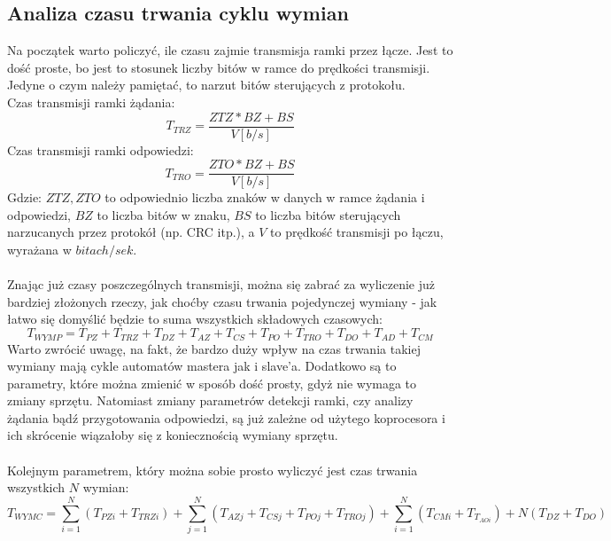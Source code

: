 	\subsection{Analiza czasu trwania cyklu wymian}
	Na początek warto policzyć, ile czasu zajmie transmisja ramki przez łącze. Jest to dość proste, bo jest to stosunek liczby bitów w ramce do prędkości transmisji. Jedyne o czym należy pamiętać, to narzut bitów sterujących z protokołu.\\
	Czas transmisji ramki żądania:
	\begin{equation}
		\label{eq:czasTrz}
		T_{TRZ} = \frac{ZTZ*BZ + BS}{V[b/s]}
	\end{equation}
	Czas transmisji ramki odpowiedzi:
	\begin{equation}
		\label{eq:czasTro}
		T_{TRO} = \frac{ZTO*BZ+BS}{V[b/s]}
	\end{equation}
	Gdzie: $ ZTZ, ZTO $ to odpowiednio liczba znaków w danych w ramce żądania i odpowiedzi, $ BZ $ to liczba bitów w znaku, $ BS $ to liczba bitów sterujących narzucanych przez protokół (np. CRC itp.), a $ V $ to prędkość transmisji po łączu, wyrażana w $ bitach/sek $.\\
	\\
	Znając już czasy poszczególnych transmisji, można się zabrać za wyliczenie już bardziej złożonych rzeczy, jak choćby czasu trwania pojedynczej wymiany - jak łatwo się domyślić będzie to suma wszystkich składowych czasowych:
	\begin{equation}
		\label{eq:czasPW}
		T_{WYMP} = T_{PZ}+T_{TRZ} + T_{DZ} + T_{AZ} + T_{CS} + T_{PO} + T_{TRO} + T_{DO} + T_{AD} + T_{CM}
	\end{equation}
	Warto zwrócić uwagę, na fakt, że bardzo duży wpływ na czas trwania takiej wymiany mają cykle automatów mastera jak i slave'a. Dodatkowo są to parametry, które można zmienić w sposób dość prosty, gdyż nie wymaga to zmiany sprzętu. Natomiast zmiany parametrów detekcji ramki, czy analizy żądania bądź przygotowania odpowiedzi, są już zależne od użytego koprocesora i ich skrócenie wiązałoby się z koniecznością wymiany sprzętu.\\
	\\
	Kolejnym parametrem, który można sobie prosto wyliczyć jest czas trwania wszystkich $ N $ wymian:
	\begin{equation}
		\label{eq:czasWW}
		T_{WYMC} = \sum\limits_{i=1}^N (T_{PZi} + T_{TRZi}) + \sum\limits_{j=1}^N (T_{AZj} + T_{CSj} + T_{POj} + T_{TROj}) + \sum\limits_{i=1}^N (T_{CMi}+T_{T_{AOi}}) + N(T_{DZ} + T_{DO})
	\end{equation}
